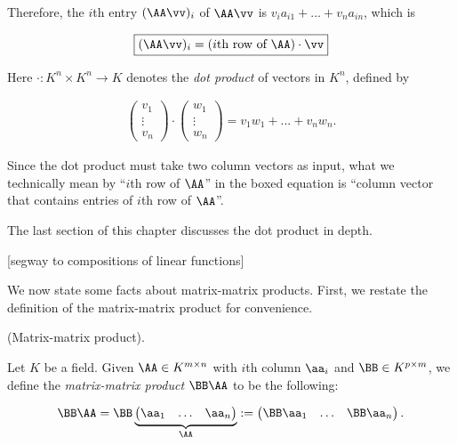 \begin{theorem}
    Therefore, the $i$th entry $(\AA \vv)_i$ of $\AA \vv$ is $v_i a_{i1} + ... + v_n a_{in} $, which is
    
    \begin{align*}
        \boxed
        {
            (\AA \vv)_i = (\text{$i$th row of $\AA$}) \cdot \vv
        }
    \end{align*}
    
    Here $\cdot:K^n \times K^n \rightarrow K$ denotes the \textit{dot product} of vectors in $K^n$, defined by
    
    \begin{align*}
        \begin{pmatrix} v_1 \\ \vdots \\ v_n \end{pmatrix}
        \cdot
        \begin{pmatrix} w_1 \\ \vdots \\ w_n \end{pmatrix}
        =
        v_1 w_1 + ... + v_n w_n.
    \end{align*}
    
    Since the dot product must take two column vectors as input, what we technically mean by ``$i$th row of $\AA$'' in the boxed equation is ``column vector that contains entries of $i$th row of $\AA$''.
    
    The last section of this chapter discusses the dot product in depth.
\end{theorem}

[segway to compositions of linear functions]

We now state some facts about matrix-matrix products. First, we restate the definition of the matrix-matrix product for convenience.

\begin{defn}
    (Matrix-matrix product).

    Let $K$ be a field. Given $\AA \in K^{m \times n}$ with $i$th column $\aa_i$ and $\BB \in K^{p \times m}$, we define the \textit{matrix-matrix product} $\BB \AA$ to be the following:

    \begin{align*}
        \BB \AA = \BB \underbrace{\begin{pmatrix} \aa_1 & \hdots & \aa_n \end{pmatrix}}_\AA := 
        \begin{pmatrix} \BB \aa_1 & \hdots & \BB \aa_n \end{pmatrix}.
    \end{align*}
\end{defn}

